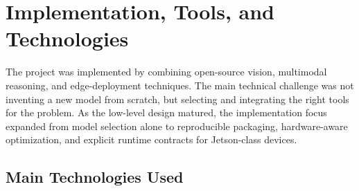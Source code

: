 \section{Implementation, Tools, and Technologies}
\label{sec:implementation}

The project was implemented by combining open-source vision,
multimodal reasoning, and edge-deployment techniques. The main technical challenge was
not inventing a new model from scratch, but selecting and integrating the right tools for the
problem. As the low-level design matured, the implementation focus expanded from model
selection alone to reproducible packaging, hardware-aware optimization, and explicit runtime
contracts for Jetson-class devices.

\subsection{Main Technologies Used}

